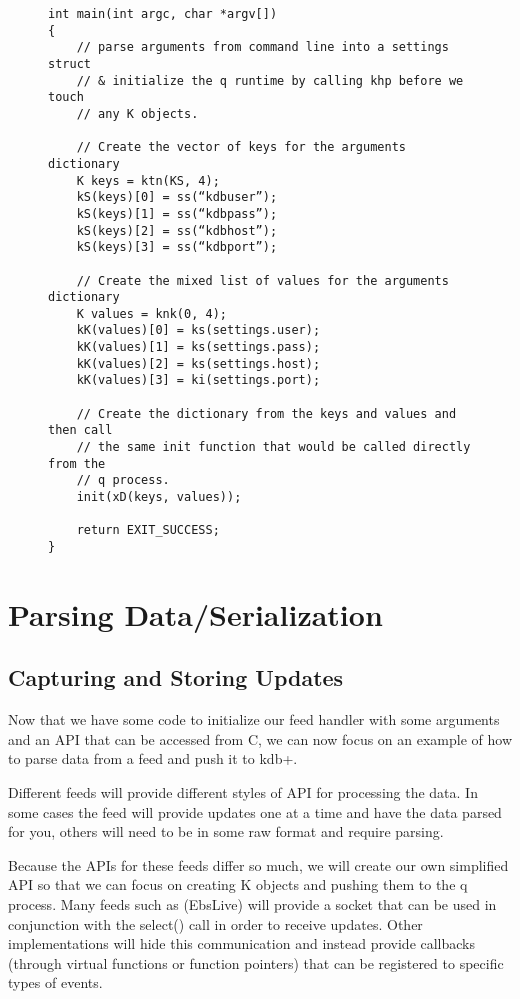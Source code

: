 \begin{figure}
\begin{lstlisting}
int main(int argc, char *argv[])
{
	// parse arguments from command line into a settings struct
	// & initialize the q runtime by calling khp before we touch
	// any K objects.

	// Create the vector of keys for the arguments dictionary
	K keys = ktn(KS, 4);
	kS(keys)[0] = ss(“kdbuser”);
	kS(keys)[1] = ss(“kdbpass”);
	kS(keys)[2] = ss(“kdbhost”);
	kS(keys)[3] = ss(“kdbport”);

	// Create the mixed list of values for the arguments dictionary
	K values = knk(0, 4);
	kK(values)[0] = ks(settings.user);
	kK(values)[1] = ks(settings.pass);
	kK(values)[2] = ks(settings.host);
	kK(values)[3] = ki(settings.port);

	// Create the dictionary from the keys and values and then call
	// the same init function that would be called directly from the
	// q process.
	init(xD(keys, values));

	return EXIT_SUCCESS;
}
\end{lstlisting}
\caption{}
\end{figure}

\section{Parsing Data/Serialization}

\subsection{Capturing and Storing Updates}

Now that we have some code to initialize our feed handler with some arguments and an API that can be accessed
from C, we can now focus on an example of how to parse data from a feed and push it to kdb+.

Different feeds will provide different styles of API for processing the data. In some cases the feed will
provide updates one at a time and have the data parsed for you, others will need to be in some raw format and
require parsing.

Because the APIs for these feeds differ so much, we will create our own simplified API so that we can focus on
creating K objects and pushing them to the q process. Many feeds such as (EbsLive) will provide a socket that
can be used in conjunction with the select() call in order to receive updates. Other implementations will hide
this communication and instead provide callbacks (through virtual functions or function pointers) that can be
registered to specific types of events.

